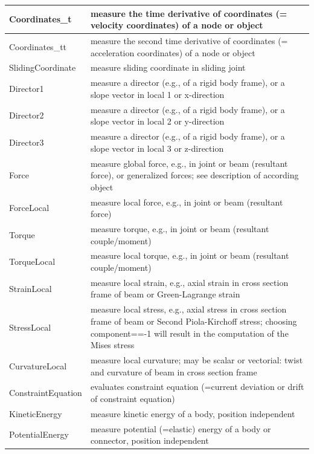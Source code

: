 \begin{center}
\begin{longtable}{| p{8cm} | p{8cm} |}
  Coordinates\_t & measure the time derivative of coordinates (= velocity coordinates) of a node or object\\ \hline  
  Coordinates\_tt & measure the second time derivative of coordinates (= acceleration coordinates) of a node or object\\ \hline  
  SlidingCoordinate & measure sliding coordinate in sliding joint\\ \hline  
  Director1 & measure a director (e.g., of a rigid body frame), or a slope vector in local 1 or x-direction\\ \hline  
  Director2 & measure a director (e.g., of a rigid body frame), or a slope vector in local 2 or y-direction\\ \hline  
  Director3 & measure a director (e.g., of a rigid body frame), or a slope vector in local 3 or z-direction\\ \hline  
  Force & measure global force, e.g., in joint or beam (resultant force), or generalized forces; see description of according object\\ \hline  
  ForceLocal & measure local force, e.g., in joint or beam (resultant force)\\ \hline  
  Torque & measure torque, e.g., in joint or beam (resultant couple/moment)\\ \hline  
  TorqueLocal & measure local torque, e.g., in joint or beam (resultant couple/moment)\\ \hline  
  StrainLocal & measure local strain, e.g., axial strain in cross section frame of beam or Green-Lagrange strain\\ \hline  
  StressLocal & measure local stress, e.g., axial stress in cross section frame of beam or Second Piola-Kirchoff stress; choosing component==-1 will result in the computation of the Mises stress\\ \hline  
  CurvatureLocal & measure local curvature; may be scalar or vectorial: twist and curvature of beam in cross section frame\\ \hline  
  ConstraintEquation & evaluates constraint equation (=current deviation or drift of constraint equation)\\ \hline  
  KineticEnergy & measure kinetic energy of a body, position independent\\ \hline  
  PotentialEnergy & measure potential (=elastic) energy of a body or connector, position independent\\ \hline  
\end{longtable}
\end{center}

